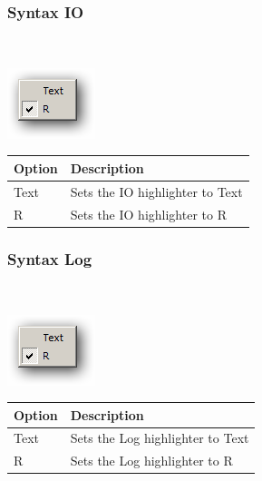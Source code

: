 \hypertarget{menu_r_rterm_syntax_IO}{}
\subsubsection{Syntax IO}\\

\includegraphics[scale=0.50]{./res/menu_r_rterm_syntax.png}\\

\begin{scriptsize}\begin{tabularx}{\textwidth}{>{\hsize=0.3\hsize}X>{\hsize=0.7\hsize}X}\\
    \hline
    \textbf{Option} & \textbf{Description} \\
    \hline
    Text & Sets the IO highlighter to Text \\
    R & Sets the IO highlighter to R \\
    \hline
  \end{tabularx}\end{scriptsize}


\hypertarget{menu_r_rterm_syntax_Log}{}
\subsubsection{Syntax Log}\\

\includegraphics[scale=0.50]{./res/menu_r_rterm_syntax.png}\\

\begin{scriptsize}\begin{tabularx}{\textwidth}{>{\hsize=0.3\hsize}X>{\hsize=0.7\hsize}X}\\
    \hline
    \textbf{Option} & \textbf{Description} \\
    \hline
    Text & Sets the Log highlighter to Text \\
    R & Sets the Log highlighter to R \\
    \hline
  \end{tabularx}\end{scriptsize}


